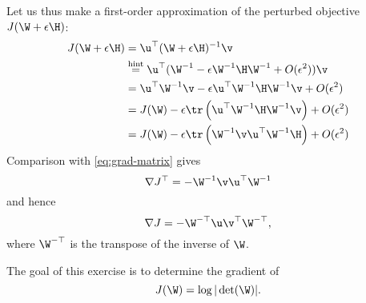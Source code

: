 \begin{exenumerate}
\begin{solution}
    Let us thus make a first-order approximation of the perturbed objective $J(\W + \epsilon \H)$: 
    \begin{align}
      J(\W + \epsilon\H) &= \u^\top(\W + \epsilon\H)^{-1}\v \\
                         &\overset{\textrm{hint}}{=} \u^\top(\W^{-1} - \epsilon \W^{-1}\H \W^{-1} + O(\epsilon^2))\v \\
                         &= \u^\top \W^{-1}\v - \epsilon \u^\top\W^{-1}\H\W^{-1}\v + O(\epsilon^2) \\
                         &= J(\W) -  \epsilon \tr\left(\u^\top\W^{- 1}\H\W^{-1}\v\right) + O(\epsilon^2) \\
                         &= J(\W) - \epsilon \tr\left(\W^{-1}\v\u^\top\W^{-1}\H\right) + O(\epsilon^2)
    \end{align}
    Comparison with \eqref{eq:grad-matrix} gives
    \begin{equation}
      \nabla J^\top = -\W^{-1}\v\u^\top\W^{-1}
    \end{equation}
    and hence
    \begin{equation}
      \nabla J = -\W^{-\top}\u\v^\top\W^{-\top},
    \end{equation}
where $\W^{-\top}$ is the transpose of the inverse of $\W$.

\end{solution}
\end{exenumerate}


\label{ex:grad-log-det}
The goal of this exercise is to determine the gradient of
\begin{equation}
  J(\W) = \log | \det(\W)|.
\end{equation}

